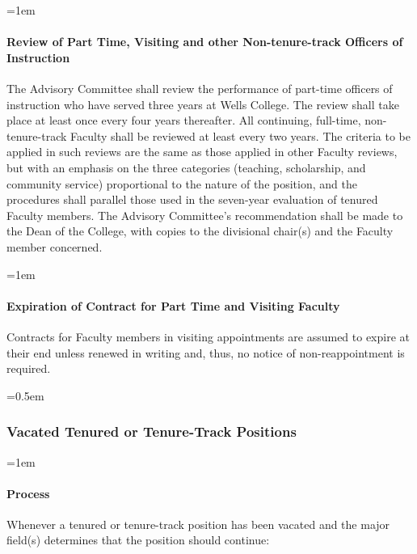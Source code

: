\documentclass{manual}
\let\oldsubsubsection\subsubsection
\renewcommand\subsubsection{\leftskip=0.5em\oldsubsubsection}
\let\oldparagraph\paragraph
\renewcommand\paragraph{\leftskip=1em\oldparagraph}
\begin{document}
\paragraph{Review of Part Time, Visiting and other Non-tenure-track Officers of Instruction}\label{par:ReviewOfPartTimeVisitingAndOtherNonTenureTrackOfficersOfInstruction}
The Advisory Committee shall review the performance of part-time officers of instruction who have served three years at Wells College. The review shall take place at least once every four years thereafter. All continuing, full-time, non-tenure-track Faculty shall be reviewed at least every two years. The criteria to be applied in such reviews are the same as those applied in other Faculty reviews, but with an emphasis on the three categories (teaching, scholarship, and community service) proportional to the nature of the position, and the procedures shall parallel those used in the seven-year evaluation of tenured Faculty members. The Advisory Committee's recommendation shall be made to the Dean of the College, with copies to the divisional chair(s) and the Faculty member concerned.

\paragraph{Expiration of Contract for Part Time and Visiting Faculty}
Contracts for Faculty members in visiting appointments are assumed to expire at their end unless renewed in writing and, thus, no notice of non-reappointment is required.

\subsubsection{Vacated Tenured or Tenure-Track Positions}

\paragraph{Process}

Whenever a tenured or tenure-track position has been vacated and the major field(s) determines that the position should continue:
\end{document}
